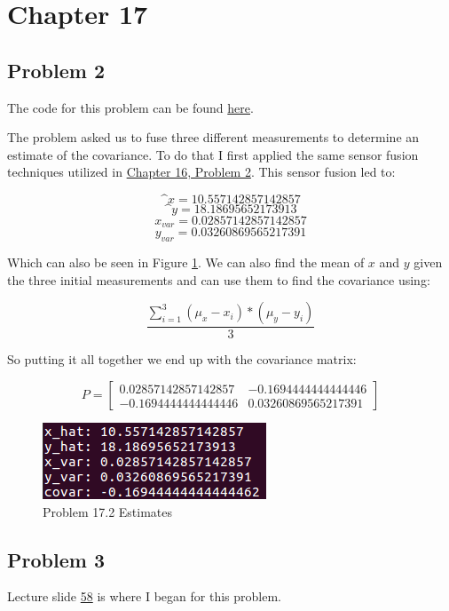 \documentclass{article}
\newcommand\ddfrac[2]{\frac{\displaystyle #1}{\displaystyle #2}}
\begin{document}
\newpage
\section{\textbf{Chapter 17}}
\subsection{Problem 2}
The code for this problem can be found 
\href{https://github.com/macattackftw/RoboticsHW/blob/master/HW5/problem17_2.py}{here}.

The problem asked us to fuse three different measurements to determine an 
estimate of the covariance. To do that I first applied the same sensor fusion 
techniques utilized in \hyperref[problem:16.2]{Chapter 16, Problem 2}. This 
sensor fusion led to:

$$\^{x} = 10.557142857142857$$
$$\^{y} = 18.18695652173913$$
$$x_{var} = 0.02857142857142857$$
$$y_{var} = 0.03260869565217391$$

Which can also be seen in Figure \ref{fig:p17_2}. We can also find the mean of 
$x$ and $y$ given the three initial measurements and can use them to find the 
covariance using:

$$\ddfrac{\sum_{i=1}^{3} (\mu_x - x_i) * (\mu_y - y_i)}{3}$$

So putting it all together we end up with the covariance matrix:

\[
P =
  \begin{bmatrix}
    0.02857142857142857 & -0.1694444444444446 \\
    -0.1694444444444446 & 0.03260869565217391
  \end{bmatrix}
\]

\begin{figure}[h]
    \centering
    \includegraphics[scale=2.5]{problem17_2_data}
    \caption{Problem 17.2 Estimates}
    \label{fig:p17_2}
\end{figure}

\subsection{Problem 3}
Lecture slide \href{https://d2l.sdbor.edu/content/enforced/2018FA/1139913-CENG-CSC-415-515-M001-2018FAIntroductiontoRobot/Robotics_Kalman.pdf}{58} is where I began for this problem. 
\end{document}
